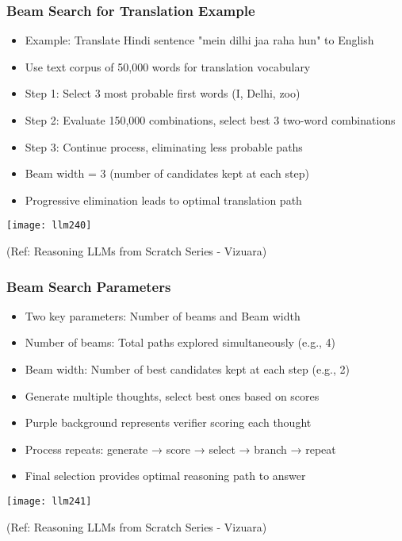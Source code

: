 \begin{frame}[fragile]\frametitle{Beam Search for Translation Example}
      \begin{itemize}
        \item Example: Translate Hindi sentence "mein dilhi jaa raha hun" to English
        \item Use text corpus of 50,000 words for translation vocabulary
        \item Step 1: Select 3 most probable first words (I, Delhi, zoo)
        \item Step 2: Evaluate 150,000 combinations, select best 3 two-word combinations
        \item Step 3: Continue process, eliminating less probable paths
        \item Beam width = 3 (number of candidates kept at each step)
        \item Progressive elimination leads to optimal translation path
      \end{itemize}
	  
		\begin{center}
	
        \texttt{[image: llm240]}
		
		{\tiny (Ref:  Reasoning LLMs from Scratch Series - Vizuara)}
		
		\end{center}		  
\end{frame}

\begin{frame}[fragile]\frametitle{Beam Search Parameters}
      \begin{itemize}
        \item Two key parameters: Number of beams and Beam width
        \item Number of beams: Total paths explored simultaneously (e.g., 4)
        \item Beam width: Number of best candidates kept at each step (e.g., 2)
        \item Generate multiple thoughts, select best ones based on scores
        \item Purple background represents verifier scoring each thought
        \item Process repeats: generate → score → select → branch → repeat
        \item Final selection provides optimal reasoning path to answer
      \end{itemize}
	  
		\begin{center}
	
        \texttt{[image: llm241]}
		
		{\tiny (Ref:  Reasoning LLMs from Scratch Series - Vizuara)}
		
		\end{center}			  
\end{frame}

